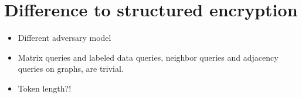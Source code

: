 \documentclass{article}
\newcommand{\oprf}[0]{\mathsf{OPRF}}
\newcommand{\getr}[0]{\stackrel{\$}{\leftarrow}}
\newcommand{\Hide}[1]{}
\let\ignore\Hide
\begin{document}
\section{Difference to structured encryption}
\begin{itemize}
\item Different adversary model
\item Matrix queries and labeled data queries, neighbor queries and adjacency queries on graphs, are trivial.
\item Token length?!
  
\end{itemize}

\ignore{
\newpage

\section{Old}
\paragraph{Preliminaries} There are two parties $P_1$ and $P_2$ with
input sets $S_1=\{e_{1,1},\ldots,e_{1,n}\}$ and
$S_2=\{e_{2,1},\ldots,e_{2,n}\}$ of elements
$e_{i,j}\in\{0,1\}^\ell$. Both parties have agreed on an Elgamal key
pair $(pk,sk)$ where $sk$ is shared between the two of them.

For security parameter $\lambda$, there exists an oblivious
pseudo-random function
$\oprf:\{0,1\}^\lambda\times\{0,1\}^\ell\rightarrow{}\{0,1\}^\ell$.
In our context, $\oprf$ will be evaluated with $P_1$ being the sender
and $P_2$ being the receiver.

\paragraph{Protocol Overview}
\begin{enumerate}[label={\bf Step {\arabic*}:},leftmargin=*]
\item Party $P_1$ prepares a binary prefix tree of its input set as follows.

  First, $P_1$ generates a random key $k\getr\{0,1\}^\lambda$ for $\oprf$.

  For each $e_{1,i}\in{}S_1$, $P_1$ computes $V_i=\oprf_k(e_{1,i})$
  and builds a prefix tree $T$ with the $V_i$ as keys. Observe that
  each node $N_i$ in $T$ contains tuple
  $(\mathsf{prefix}_i,\mathsf{L}_i,\mathsf{R}_i)$, where
  $\mathsf{prefix}_i$ is node $N_i$'s bit string prefix, and
  $\mathsf{L}_i$ and $\mathsf{R}_i$ are pointers to the $N_i$'s left
  and right children and can therefore be $\bot$.


\end{enumerate}}
\end{document}
